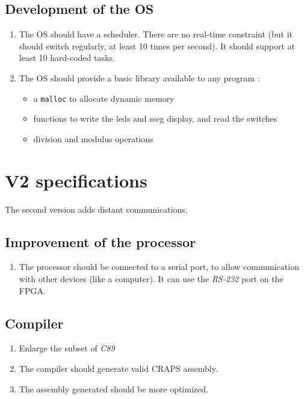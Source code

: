 \documentclass{article}
\begin{document}
      \subsection{Development of the OS}
        \begin{enumerate}
          \item The OS should have a scheduler. There are no real-time
          constraint (but it should switch regularly, at least 10 times per
          second). It should support at least 10 hard-coded tasks.
          \item The OS should provide a basic library available to any program :
            \begin{itemize}
              \item a \verb+malloc+ to allocate dynamic memory
              \item functions to write the leds and sseg display, and read the
                 switches
              \item division and modulus operations
             \end{itemize}
        \end{enumerate}

    \section{V2 specifications}
    The second version adds distant communications.
      \subsection{Improvement of the processor}
        \begin{enumerate}
          \item The processor should be connected to a serial port, to allow 
            communication with other devices (like a computer). It can use the
            \textit{RS-232} port on the FPGA.
        \end{enumerate}

      \subsection{Compiler}
        \begin{enumerate}     
          \item Enlarge the subset of \textit{C89}
          \item The compiler should generate valid CRAPS assembly.
          \item The assembly generated should be more optimized. 
        \end{enumerate}
\end{document}
